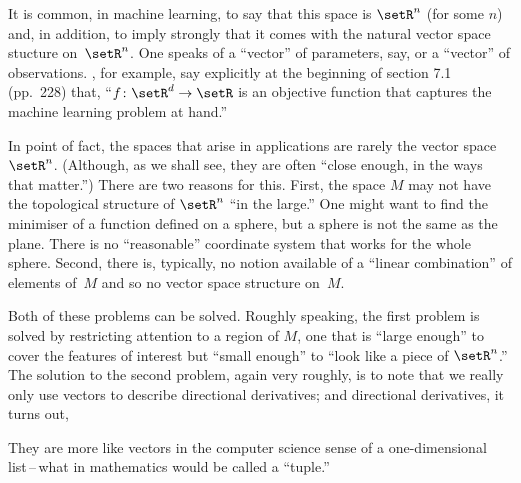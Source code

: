 \documentclass[10pt, a4paper]{article}
\begin{document}
It is common, in machine learning, to say that this space is $\setR^n$
(for some $n$) and, in addition, to imply strongly that it comes with
the natural vector space stucture on~$\setR^n$. One speaks of a
``vector'' of parameters, say, or a ``vector'' of
observations. \textcite{deisenroth2020mathematics}, for example, say
explicitly at the beginning of section 7.1 (pp.~228) that,
``$f\colon\setR^d\to\setR$ is an objective function that captures the
machine learning problem at hand.''

In point of fact, the spaces that arise in applications are rarely the
vector space $\setR^n$. (Although, as we shall see, they are often
``close enough, in the ways that matter.'') There are two reasons for
this. First, the space $M$ may not have the topological structure of
$\setR^n$ ``in the large.'' One might want to find the minimiser of a
function defined on a sphere, but a sphere is not the same as the
plane. There is no ``reasonable'' coordinate system that works for the
whole sphere. Second, there is, typically, no notion available of a
``linear combination'' of elements of~$M$ and so no vector space
structure on~$M$.

Both of these problems can be solved. Roughly speaking, the first
problem is solved by restricting attention to a region of $M$, one
that is ``large enough'' to cover the features of interest but ``small
enough'' to ``look like a piece of $\setR^n$.'' The solution to the
second problem, again very roughly, is to note that we really only use
vectors to describe directional derivatives; and directional
derivatives, it turns out, 



They are more like vectors in the
computer science sense of a one-dimensional list\,--\,what in
mathematics would be called a ``tuple.''
\end{document}
